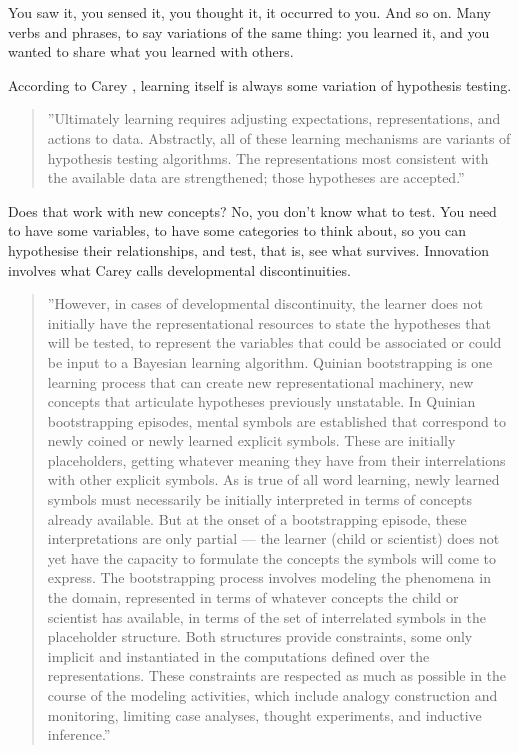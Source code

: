 You saw it, you sensed it, you thought it, it occurred to you. And so on. Many verbs and phrases, to say variations of the same thing: you learned it, and you wanted to share what you learned with others.

According to Carey \cite{carey2009origin,carey2011precis}, learning itself is always some variation of hypothesis testing.

\begin{quote}
''Ultimately learning requires adjusting expectations, representations, and actions to data. Abstractly, all of these learning mechanisms are variants of hypothesis testing algorithms. The representations most consistent with the available data are strengthened; those hypotheses are accepted.'' \cite{carey2011precis}
\end{quote}

Does that work with new concepts? No, you don't know what to test. You need to have some variables, to have some categories to think about, so you can hypothesise their relationships, and test, that is, see what survives. Innovation involves what Carey calls developmental discontinuities.

\begin{quote}
''However, in cases of developmental discontinuity, the learner does not initially have the representational resources to state the hypotheses that will be tested, to represent the variables that could be associated or could be input to a Bayesian learning algorithm. Quinian bootstrapping is one learning process that can create new representational machinery, new concepts that articulate hypotheses previously unstatable. In Quinian bootstrapping episodes, mental symbols are established that correspond to newly coined or newly learned explicit symbols. These are initially placeholders, getting whatever meaning they have from their interrelations with other explicit symbols. As is true of all word learning, newly learned symbols must necessarily be initially interpreted in terms of concepts already available. But at the onset of a bootstrapping episode, these interpretations are only partial — the learner (child or scientist) does not yet have the capacity to formulate the concepts the symbols will come to express. The bootstrapping process involves modeling the phenomena in the domain, represented in terms of whatever concepts the child or scientist has available, in terms of the set of interrelated symbols in the placeholder structure. Both structures provide constraints, some only implicit and instantiated in the computations defined over the representations. These constraints are respected as much as possible in the course of the modeling activities, which include analogy construction and monitoring, limiting case analyses, thought experiments, and inductive inference.'' \cite{carey2011precis}
\end{quote}

